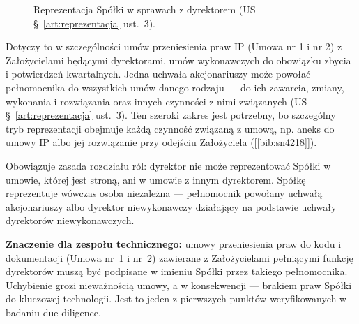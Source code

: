 \documentclass[11pt,a4paper]{report}
\newcommand{\Zr}[1]{[\ref{bib:#1}]}
\begin{document}
\begin{figure}[H]
\centering
{}
\caption{Reprezentacja Spółki w sprawach z dyrektorem (US §~\ref{art:reprezentacja} ust.~3).}
\end{figure}

Dotyczy to w szczególności umów przeniesienia praw IP (Umowa nr 1 i nr 2) z Założycielami będącymi dyrektorami, umów wykonawczych do obowiązku zbycia i potwierdzeń kwartalnych. Jedna uchwała akcjonariuszy może powołać pełnomocnika do wszystkich umów danego rodzaju --- do ich zawarcia, zmiany, wykonania i rozwiązania oraz innych czynności z nimi związanych (US §~\ref{art:reprezentacja} ust.~3). Ten szeroki zakres jest potrzebny, bo szczególny tryb reprezentacji obejmuje każdą czynność związaną z umową, np. aneks do umowy IP albo jej rozwiązanie przy odejściu Założyciela (\Zr{sn4218}).

\begin{OCoChodzi}
Obowiązuje zasada rozdziału ról: dyrektor nie może reprezentować Spółki w umowie, której jest stroną, ani w umowie z innym dyrektorem. Spółkę reprezentuje wówczas osoba niezależna --- pełnomocnik powołany uchwałą akcjonariuszy albo dyrektor niewykonawczy działający na podstawie uchwały dyrektorów niewykonawczych.

\textbf{Znaczenie dla zespołu technicznego:} umowy przeniesienia praw do kodu i dokumentacji (Umowa nr~1 i nr~2) zawierane z Założycielami pełniącymi funkcję dyrektorów muszą być podpisane w imieniu Spółki przez takiego pełnomocnika. Uchybienie grozi nieważnością umowy, a w konsekwencji --- brakiem praw Spółki do kluczowej technologii. Jest to jeden z pierwszych punktów weryfikowanych w badaniu due diligence.
\end{OCoChodzi}
\end{document}
